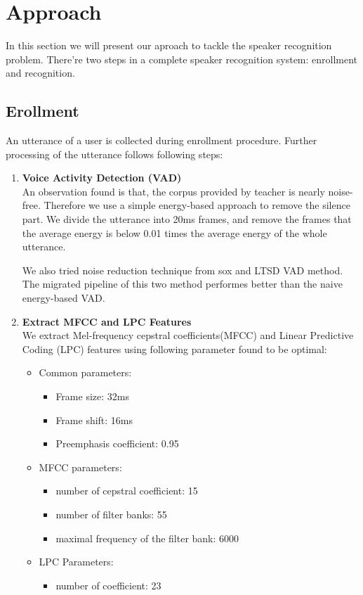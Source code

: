 \section{Approach}
	In this section we will present our aproach to tackle the speaker recognition problem.
	There're two steps in a complete speaker recognition system: enrollment and recognition.

\subsection{Erollment}
	\label{sec:approach_enrollment}
	An utterance of a user is collected during enrollment procedure.
	Further processing of the utterance follows following steps:
	\begin{enumerate}
		\item \textbf{Voice Activity Detection (VAD)} \\
			An observation found is that, the corpus provided by teacher is
			nearly noise-free. Therefore we use a simple energy-based approach
			to remove the silence part. We divide the utterance into 20ms frames,
			and remove the frames that the average energy is below 0.01 times
			the average energy of the whole utterance.

            We also tried noise reduction technique from sox and LTSD VAD method.
        The migrated pipeline of this two method performes better than the naive energy-based VAD.

		\item \textbf{Extract MFCC and LPC Features} \\ We extract
			Mel-frequency cepstral coefficients(MFCC) and Linear Predictive
			Coding (LPC) features using following parameter found to be
			optimal:

			\begin{itemize}
				\item Common parameters:
					\begin{itemize}
						\item Frame size: 32ms
						\item Frame shift: 16ms
						\item Preemphasis coefficient: 0.95
					\end{itemize}
				\item MFCC parameters:
					\begin{itemize}
						\item number of cepstral coefficient: 15
						\item number of filter banks: 55
						\item maximal frequency of the filter bank: 6000
					\end{itemize}
				\item LPC Parameters:
					\begin{itemize}
						\item number of coefficient: 23
					\end{itemize}
			\end{itemize}


\end{enumerate}
